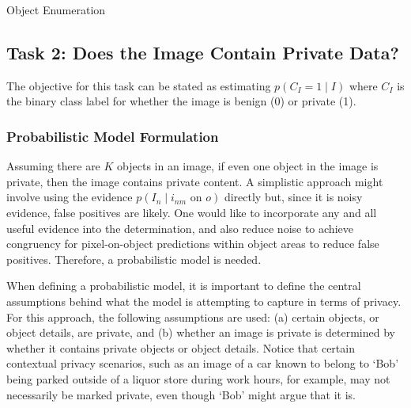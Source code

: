 \documentclass[11pt]{article}
\begin{document}
\begin{algorithm}[h!]\label{alg:objEnum}
\caption{Object Enumeration}
\end{algorithm}


\subsection{Task 2: Does the Image Contain Private Data?}

The objective for this task can be stated as estimating $p(C_I = 1 \mid I)$ where $C_I$ is the binary class label for whether the image is benign (0) or private (1).  


\subsubsection{Probabilistic Model Formulation}

Assuming there are $K$ objects in an image, if even one object in the image is private, then the image contains private content.  A simplistic approach might involve using the evidence $p(I_n \mid i_{nm} \textrm{ on } o)$ directly but, since it is noisy evidence, false positives are likely.  One would like to incorporate any and all useful evidence into the determination, and also reduce noise to achieve congruency for pixel-on-object predictions within object areas to reduce false positives. Therefore, a probabilistic model is needed.

When defining a probabilistic model, it is important to define the central assumptions behind what the model is attempting to capture in terms of privacy. For this approach, the following assumptions are used: (a) certain objects, or object details, are private, and (b) whether an image is private is determined by whether it contains private objects or object details.  Notice that certain contextual privacy scenarios, such as an image of a car known to belong to `Bob' being parked outside of a liquor store during work hours, for example, may not necessarily be marked private, even though `Bob' might argue that it is.
\end{document}
